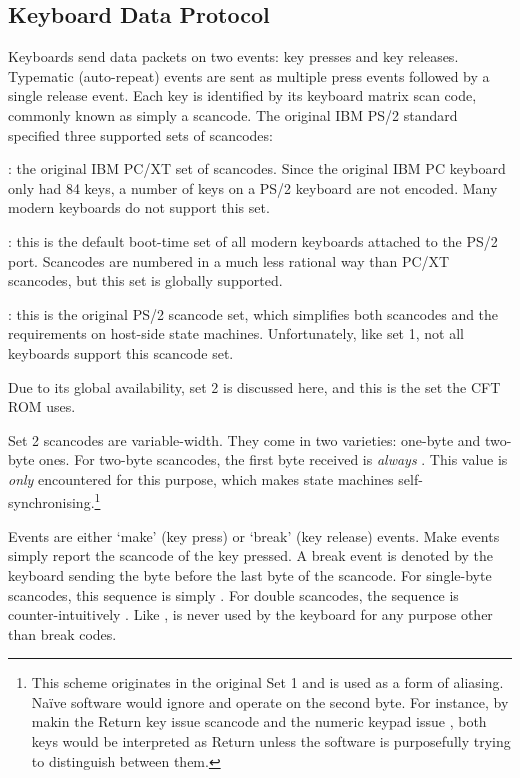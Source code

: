 \subsection{Keyboard Data Protocol}

Keyboards send data packets on two events: key presses and key
releases. Typematic (auto-repeat) events are sent as multiple press events
followed by a single release event. Each key is identified by its keyboard
matrix scan code, commonly known as simply a scancode. The original IBM PS/2
standard specified three supported sets of scancodes:

\begin{description}
: the original IBM PC/XT set of scancodes. Since the original IBM PC
keyboard only had 84 keys, a number of keys on a PS/2 keyboard are not
encoded. Many modern keyboards do not support this set.

: this is the default boot-time set of all modern keyboards
attached to the PS/2 port. Scancodes are numbered in a much less rational
way than PC/XT scancodes, but this set is globally supported.

: this is the original PS/2 scancode set, which simplifies both
scancodes and the requirements on host-side state machines. Unfortunately, like
set 1, not all keyboards support this scancode set.
\end{description}

Due to its global availability, set 2 is discussed here, and this is the set
the CFT ROM uses.

Set 2 scancodes are variable-width. They come in two varieties: one-byte and
two-byte ones. For two-byte scancodes, the first byte received is {\em
  always\/} . This value is {\em only\/} encountered for this purpose,
which makes state machines self-synchronising.\footnote{This scheme originates
  in the original Set 1 and is used as a form of aliasing. Naïve software would
  ignore  and operate on the second byte. For instance, by makin the
  Return key issue scancode  and the numeric keypad issue ,
  both keys would be interpreted as Return unless the software is purposefully
  trying to distinguish between them.}

Events are either ‘make’ (key press) or ‘break’ (key release) events. Make
events simply report the scancode of the key pressed. A break event is denoted
by the keyboard sending the byte  before the last byte of the
scancode. For single-byte scancodes, this sequence is simply . For
double scancodes, the sequence is counter-intuitively . Like
,  is never used by the keyboard for any purpose other than
break codes.


